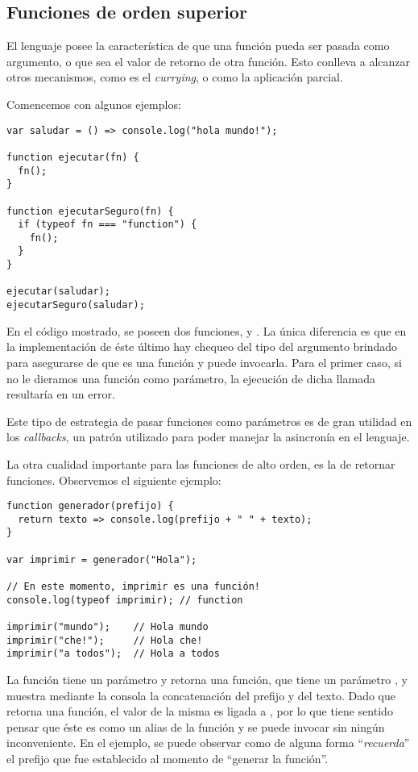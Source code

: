 \subsection{Funciones de orden superior}

El lenguaje posee la característica de que una función pueda ser pasada como argumento, o que sea el valor de retorno de otra función. Esto conlleva a alcanzar otros mecanismos, como es el \textit{currying}, o como la aplicación parcial.

Comencemos con algunos ejemplos:

\begin{lstlisting}[title={Pasando una función como argumento}]
var saludar = () => console.log("hola mundo!");

function ejecutar(fn) {
  fn();
}

function ejecutarSeguro(fn) {
  if (typeof fn === "function") {
    fn();
  }
}

ejecutar(saludar);
ejecutarSeguro(saludar);
\end{lstlisting}

En el código mostrado, se poseen dos funciones,  y . La única diferencia es que en la implementación de éste último hay chequeo del tipo del argumento brindado para asegurarse de que es una función y puede invocarla. Para el primer caso, si no le dieramos una función como parámetro, la ejecución de dicha llamada resultaría en un error.

Este tipo de estrategia de pasar funciones como parámetros es de gran utilidad en los \textit{callbacks}, un patrón utilizado para poder manejar la asincronía en el lenguaje. 

La otra cualidad importante para las funciones de alto orden, es la de retornar funciones. Observemos el siguiente ejemplo:

\begin{lstlisting}[title={Retornando funciones}]
function generador(prefijo) {
  return texto => console.log(prefijo + " " + texto);
}

var imprimir = generador("Hola");

// En este momento, imprimir es una función!
console.log(typeof imprimir); // function

imprimir("mundo");    // Hola mundo
imprimir("che!");     // Hola che!
imprimir("a todos");  // Hola a todos
\end{lstlisting}

La función  tiene un parámetro  y retorna una función, que tiene un parámetro , y muestra mediante la consola la concatenación del prefijo y del texto. Dado que  retorna una función, el valor de la misma es ligada a , por lo que tiene sentido pensar que éste es como un alias de la función y se puede invocar sin ningún inconveniente. En el ejemplo, se puede observar como  de alguna forma "`\textit{recuerda}"' el prefijo que fue establecido al momento de "`generar la función"'.

